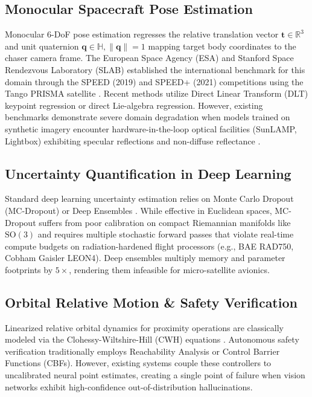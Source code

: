 \documentclass[conference]{IEEEtran}
\begin{document}
\subsection{Monocular Spacecraft Pose Estimation}
Monocular 6-DoF pose estimation regresses the relative translation vector $\mathbf{t} \in \mathbb{R}^3$ and unit quaternion $\mathbf{q} \in \mathbb{H}, \|\mathbf{q}\|=1$ mapping target body coordinates to the chaser camera frame. The European Space Agency (ESA) and Stanford Space Rendezvous Laboratory (SLAB) established the international benchmark for this domain through the SPEED (2019) and SPEED+ (2021) competitions using the Tango PRISMA satellite \cite{kisantal2020speed, park2021speedplus}. Recent methods utilize Direct Linear Transform (DLT) keypoint regression or direct Lie-algebra regression. However, existing benchmarks demonstrate severe domain degradation when models trained on synthetic imagery encounter hardware-in-the-loop optical facilities (SunLAMP, Lightbox) exhibiting specular reflections and non-diffuse reflectance \cite{park2021speedplus}.

\subsection{Uncertainty Quantification in Deep Learning}
Standard deep learning uncertainty estimation relies on Monte Carlo Dropout (MC-Dropout) \cite{gal2016dropout} or Deep Ensembles \cite{lakshminarayanan2017simple}. While effective in Euclidean spaces, MC-Dropout suffers from poor calibration on compact Riemannian manifolds like $\mathrm{SO}(3)$ and requires multiple stochastic forward passes that violate real-time compute budgets on radiation-hardened flight processors (e.g., BAE RAD750, Cobham Gaisler LEON4). Deep ensembles multiply memory and parameter footprints by $5\times$, rendering them infeasible for micro-satellite avionics.

\subsection{Orbital Relative Motion \& Safety Verification}
Linearized relative orbital dynamics for proximity operations are classically modeled via the Clohessy-Wiltshire-Hill (CWH) equations \cite{clohessy1960terminal}. Autonomous safety verification traditionally employs Reachability Analysis or Control Barrier Functions (CBFs). However, existing systems couple these controllers to uncalibrated neural point estimates, creating a single point of failure when vision networks exhibit high-confidence out-of-distribution hallucinations.
\end{document}
